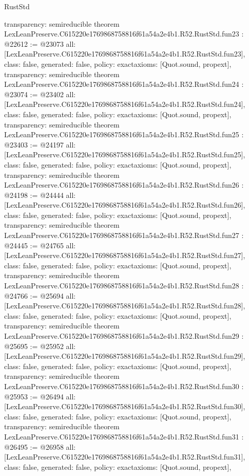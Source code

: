 \begin{lexlean}{RustStd}
\begin{coremodule}
{  transparency: semireducible
}
theorem LexLeanPreserve.C615220e1769868758816f61a54a2e4b1.R52.RustStd.fun23 : @22612 := @23073 {
  all: [LexLeanPreserve.C615220e1769868758816f61a54a2e4b1.R52.RustStd.fun23],
  class: false,
  generated: false,
  policy: exact{axioms: [Quot.sound, propext]},
  transparency: semireducible
}
theorem LexLeanPreserve.C615220e1769868758816f61a54a2e4b1.R52.RustStd.fun24 : @23074 := @23402 {
  all: [LexLeanPreserve.C615220e1769868758816f61a54a2e4b1.R52.RustStd.fun24],
  class: false,
  generated: false,
  policy: exact{axioms: [Quot.sound, propext]},
  transparency: semireducible
}
theorem LexLeanPreserve.C615220e1769868758816f61a54a2e4b1.R52.RustStd.fun25 : @23403 := @24197 {
  all: [LexLeanPreserve.C615220e1769868758816f61a54a2e4b1.R52.RustStd.fun25],
  class: false,
  generated: false,
  policy: exact{axioms: [Quot.sound, propext]},
  transparency: semireducible
}
theorem LexLeanPreserve.C615220e1769868758816f61a54a2e4b1.R52.RustStd.fun26 : @24198 := @24444 {
  all: [LexLeanPreserve.C615220e1769868758816f61a54a2e4b1.R52.RustStd.fun26],
  class: false,
  generated: false,
  policy: exact{axioms: [Quot.sound, propext]},
  transparency: semireducible
}
theorem LexLeanPreserve.C615220e1769868758816f61a54a2e4b1.R52.RustStd.fun27 : @24445 := @24765 {
  all: [LexLeanPreserve.C615220e1769868758816f61a54a2e4b1.R52.RustStd.fun27],
  class: false,
  generated: false,
  policy: exact{axioms: [Quot.sound, propext]},
  transparency: semireducible
}
theorem LexLeanPreserve.C615220e1769868758816f61a54a2e4b1.R52.RustStd.fun28 : @24766 := @25694 {
  all: [LexLeanPreserve.C615220e1769868758816f61a54a2e4b1.R52.RustStd.fun28],
  class: false,
  generated: false,
  policy: exact{axioms: [Quot.sound, propext]},
  transparency: semireducible
}
theorem LexLeanPreserve.C615220e1769868758816f61a54a2e4b1.R52.RustStd.fun29 : @25695 := @25952 {
  all: [LexLeanPreserve.C615220e1769868758816f61a54a2e4b1.R52.RustStd.fun29],
  class: false,
  generated: false,
  policy: exact{axioms: [Quot.sound, propext]},
  transparency: semireducible
}
theorem LexLeanPreserve.C615220e1769868758816f61a54a2e4b1.R52.RustStd.fun30 : @25953 := @26494 {
  all: [LexLeanPreserve.C615220e1769868758816f61a54a2e4b1.R52.RustStd.fun30],
  class: false,
  generated: false,
  policy: exact{axioms: [Quot.sound, propext]},
  transparency: semireducible
}
theorem LexLeanPreserve.C615220e1769868758816f61a54a2e4b1.R52.RustStd.fun31 : @26495 := @26958 {
  all: [LexLeanPreserve.C615220e1769868758816f61a54a2e4b1.R52.RustStd.fun31],
  class: false,
  generated: false,
  policy: exact{axioms: [Quot.sound, propext]},
}
\end{coremodule}
\end{lexlean}

